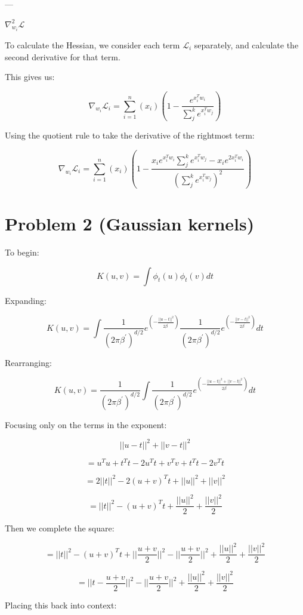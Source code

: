 \documentclass[11pt]{article}
\begin{document}
\begin{enumerate}
---

$\nabla^2_{w_i} \mathcal{L}$

To calculate the Hessian, we consider each term $\mathcal{L}_i$ separately, and calculate the second derivative for that term.

This gives us:

\[
\nabla_{w_i} \mathcal{L}_i = \sum_{i=1}^{n}(x_i) (1 - \frac{e^{x_i^Tw_i}}{\sum_j^k e^{x_i^Tw_j}})
\]

Using the quotient rule to take the derivative of the rightmost term:

\[
\nabla_{w_i} \mathcal{L}_i = \sum_{i=1}^{n}(x_i) (1 - \frac{x_i e^{x_i^Tw_i}\sum_j^k e^{x_i^Tw_j} - x_i e^{2x_i^Tw_i}}{(\sum_j^k e^{x_i^Tw_j})^2})
\]

\end{enumerate}

\section*{Problem 2 (Gaussian kernels)}

To begin:

\[
K(u, v) = \int \phi_t(u) \phi_t(v) dt
\]

Expanding:

\[
K(u, v) = \int \frac{1}{(2\pi\beta^\prime)^{d/2}}e^{({- \frac{||u - t||^2}{2\beta^\prime}})} \frac{1}{(2\pi\beta^\prime)^{d/2}}e^{({- \frac{||v - t||^2}{2\beta^\prime}})} dt
\]

Rearranging:

\[
K(u, v) = \frac{1}{(2\pi\beta^\prime)^{d/2}} \int \frac{1}{(2\pi\beta^\prime)^{d/2}}e^{({- \frac{||u - t||^2 + ||v - t||^2}{2\beta^\prime}})} dt
\]

Focusing only on the terms in the exponent:

\[
||u - t||^2 + ||v - t||^2
\]

\[
= u^Tu + t^Tt - 2u^Tt + v^Tv + t^Tt - 2v^Tt
\]

\[
= 2||t||^2 - 2(u + v)^Tt + ||u||^2 + ||v||^2
\]

\[
= ||t||^2 - (u + v)^Tt + \frac{||u||^2}{2} + \frac{||v||^2}{2}
\]

Then we complete the square:

\[
= ||t||^2 - (u + v)^Tt + ||\frac{u+v}{2}||^2 -  ||\frac{u+v}{2}||^2 + \frac{||u||^2}{2} + \frac{||v||^2}{2}
\]

\[
= ||t - \frac{u + v}{2}||^2 - ||\frac{u+v}{2}||^2 + \frac{||u||^2}{2} + \frac{||v||^2}{2}
\]

Placing this back into context:
\end{document}
